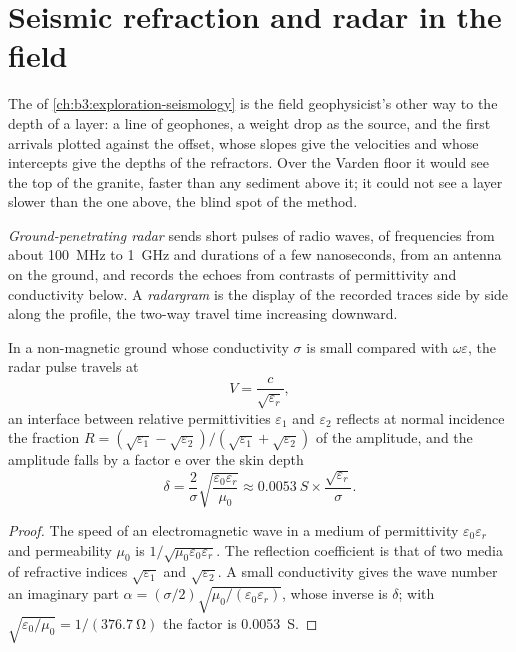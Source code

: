\section{Seismic refraction and radar in the field}\label{sec:b3:field-lab-methods-3:radar}

The  of \cref{ch:b3:exploration-seismology}
is the field geophysicist's other way to the depth of a layer: a line
of geophones, a weight drop as the source, and the first arrivals
plotted against the offset, whose slopes give the velocities and whose
intercepts give the depths of the refractors. Over the Varden floor it
would see the top of the granite, faster than any sediment above it; it
could not see a layer slower than the one above, the blind spot of the
method.

\begin{definition}\label{def:b3:field-lab-methods-3:gpr}
\emph{Ground-penetrating radar} sends
short pulses of radio waves, of frequencies from about \qty{100}{MHz}
to \qty{1}{GHz} and durations of a few nanoseconds, from an antenna on
the ground, and records the echoes from contrasts of permittivity and
conductivity below. A \emph{radargram} is the display
of the recorded traces side by side along the profile, the two-way
travel time increasing downward.
\end{definition}

\begin{proposition}\label{prop:b3:field-lab-methods-3:radar}
In a non-magnetic ground whose conductivity $\sigma$ is small compared
with $\omega\varepsilon$, the radar pulse travels at
\[
V = \frac{c}{\sqrt{\varepsilon_r}} ,
\]
an interface between relative permittivities $\varepsilon_1$ and
$\varepsilon_2$ reflects at normal incidence the fraction $R =
(\sqrt{\varepsilon_1} - \sqrt{\varepsilon_2})/(\sqrt{\varepsilon_1} +
\sqrt{\varepsilon_2})$ of the amplitude, and the amplitude falls by a
factor $\mathrm{e}$ over the skin depth
\[
\delta = \frac{2}{\sigma}\sqrt{\frac{\varepsilon_0\varepsilon_r}{\mu_0}}
       \approx \qty{0.0053}{S}\times\frac{\sqrt{\varepsilon_r}}{\sigma} .
\]
\end{proposition}

\begin{proof}
The speed of an electromagnetic wave in a medium of permittivity
$\varepsilon_0\varepsilon_r$ and permeability $\mu_0$ is
$1/\sqrt{\mu_0\varepsilon_0\varepsilon_r}$. The reflection coefficient
is that of two media of refractive indices $\sqrt{\varepsilon_1}$ and
$\sqrt{\varepsilon_2}$. A small conductivity gives the wave number an
imaginary part $\alpha = (\sigma/2)\sqrt{\mu_0/(\varepsilon_0
\varepsilon_r)}$, whose inverse is $\delta$; with $\sqrt{\varepsilon_0/
\mu_0} = 1/(\qty{376.7}{\ohm})$ the factor is \qty{0.0053}{S}.
\end{proof}

